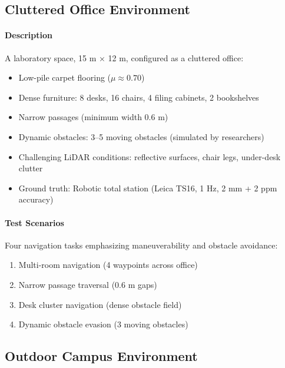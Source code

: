 \subsection{Cluttered Office Environment}

\paragraph{Description}
A laboratory space, 15 m × 12 m, configured as a cluttered office:
\begin{itemize}
    \item Low-pile carpet flooring ($\mu \approx 0.70$)
    \item Dense furniture: 8 desks, 16 chairs, 4 filing cabinets, 2 bookshelves
    \item Narrow passages (minimum width 0.6 m)
    \item Dynamic obstacles: 3--5 moving obstacles (simulated by researchers)
    \item Challenging LiDAR conditions: reflective surfaces, chair legs, under-desk clutter
    \item Ground truth: Robotic total station (Leica TS16, 1 Hz, 2 mm + 2 ppm accuracy)
\end{itemize}


\paragraph{Test Scenarios}
Four navigation tasks emphasizing maneuverability and obstacle avoidance:
\begin{enumerate}
    \item Multi-room navigation (4 waypoints across office)
    \item Narrow passage traversal (0.6 m gaps)
    \item Desk cluster navigation (dense obstacle field)
    \item Dynamic obstacle evasion (3 moving obstacles)
\end{enumerate}

\subsection{Outdoor Campus Environment}

